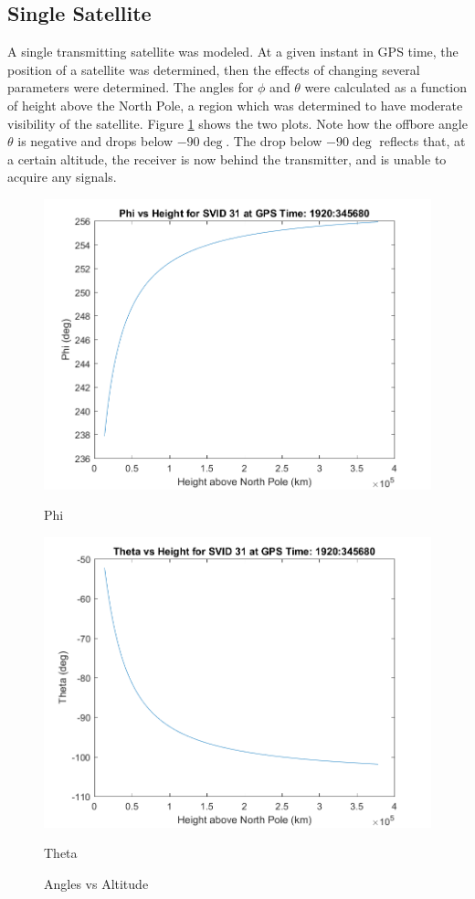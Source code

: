 \documentclass[11pt]{article}
\begin{document}
\subsection{Single Satellite}
A single transmitting satellite was modeled. At a given instant in GPS time, the position of a satellite was determined, then the effects of changing several parameters were determined. The angles for $\phi$ and $\theta$ were calculated as a function of height above the North Pole, a region which was determined to have moderate visibility of the satellite. Figure \ref{fig:phiandtheta} shows the two plots. Note how the offbore angle $\theta$ is negative and drops below $-90\deg$. The drop below $-90\deg$ reflects that, at a certain altitude, the receiver is now behind the transmitter, and is unable to acquire any signals.

\begin{figure}[h]
\centering
\begin{minipage}{0.45\linewidth}
\includegraphics[width=\textwidth]{../images/phivsheight.png}
\caption{Phi}
\end{minipage}
\begin{minipage}{0.45\linewidth}
\includegraphics[width=\textwidth]{../images/thetavsheight.png}
\caption{Theta}
\end{minipage}
\caption{Angles vs Altitude}
\label{fig:phiandtheta}
\end{figure}
\end{document}
